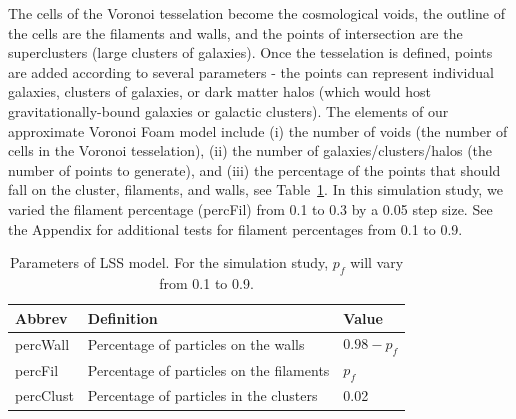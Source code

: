 \documentclass[12pt]{article}
\begin{document}
The cells of the Voronoi tesselation become the cosmological voids, the outline of the cells are the filaments and walls, and the points of intersection are the superclusters (large clusters of galaxies).  Once the tesselation is defined, points are added according to several parameters - the points can represent individual galaxies, clusters of galaxies, or dark matter halos (which would host gravitationally-bound galaxies or galactic clusters).
The elements of our approximate Voronoi Foam model include (i) the number of voids (the number of cells in the Voronoi tesselation), (ii) the number of galaxies/clusters/halos (the number of points to generate), and (iii) the percentage of the points that should fall on the cluster, filaments, and walls, see Table~\ref{table:voronoisettings}. In this simulation study, we varied the filament percentage (percFil) from 0.1 to 0.3 by a 0.05 step size. See the Appendix for additional tests for filament percentages from 0.1 to 0.9.

\begin{table}[htp!]
\begin{center}
\begin{tabular}{ l|l|l } 
Abbrev & Definition & Value \\ 
\hline
percWall & Percentage of particles on the walls & $0.98 - p_{f}$ \\ 
percFil & Percentage of particles on the filaments & $p_{f}$ \\ 
percClust & Percentage of particles in the clusters & 0.02 \\ 
\end{tabular}
\end{center}
\caption{Parameters of LSS model. For the simulation study, $p_{f}$ will vary from 0.1 to 0.9.}
\label{table:voronoisettings}
\end{table}
\end{document}
